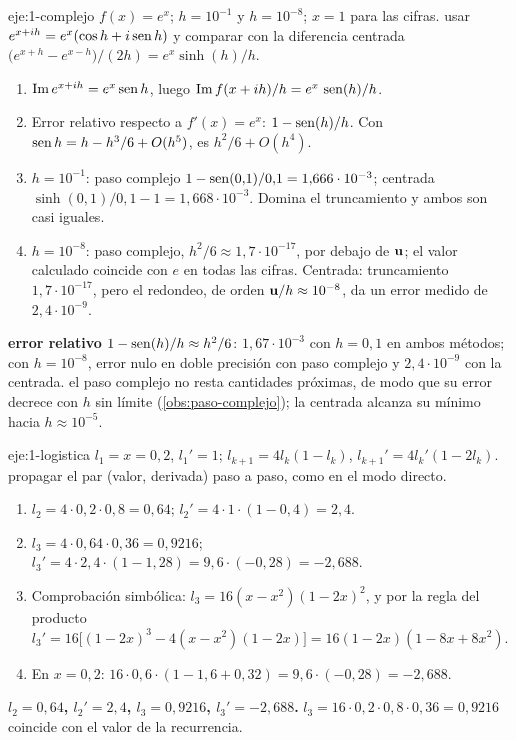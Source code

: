 \begin{solucion}{eje:1-complejo}
\datos $f(x)=e^{x}$; $h=10^{-1}$ y $h=10^{-8}$; $x=1$ para las cifras.
\planteamiento usar $e^{x+ih}=e^{x}(\cos h+i\operatorname{sen} h)$ y comparar con la diferencia centrada $\bigl(e^{x+h}-e^{x-h}\bigr)/(2h)=e^{x}\sinh(h)/h$.
\pasos
\begin{enumerate}[label=\arabic*.]
  \item $\operatorname{Im}e^{x+ih}=e^{x}\operatorname{sen} h$, luego $\operatorname{Im}f(x+ih)/h=e^{x}\,\operatorname{sen}(h)/h$.
  \item Error relativo respecto a $f'(x)=e^{x}$: $1-\operatorname{sen}(h)/h$. Con $\operatorname{sen} h=h-h^{3}/6+O(h^{5})$, es $h^{2}/6+O(h^{4})$.
  \item $h=10^{-1}$: paso complejo $1-\operatorname{sen}(0{,}1)/0{,}1=1{,}666\cdot 10^{-3}$; centrada $\sinh(0{,}1)/0{,}1-1=1{,}668\cdot 10^{-3}$. Domina el truncamiento y ambos son casi iguales.
  \item $h=10^{-8}$: paso complejo, $h^{2}/6\approx 1{,}7\cdot 10^{-17}$, por debajo de $\mathbf{u}$; el valor calculado coincide con $e$ en todas las cifras. Centrada: truncamiento $1{,}7\cdot 10^{-17}$, pero el redondeo, de orden $\mathbf{u}/h\approx 10^{-8}$, da un error medido de $2{,}4\cdot 10^{-9}$.
\end{enumerate}
\resultado \textbf{error relativo $1-\operatorname{sen}(h)/h\approx h^{2}/6$}: $1{,}67\cdot 10^{-3}$ con $h=0{,}1$ en ambos métodos; con $h=10^{-8}$, error nulo en doble precisión con paso complejo y $2{,}4\cdot 10^{-9}$ con la centrada.
\comprobacion el paso complejo no resta cantidades próximas, de modo que su error decrece con $h$ sin límite (\cref{obs:paso-complejo}); la centrada alcanza su mínimo hacia $h\approx 10^{-5}$.
\end{solucion}

\begin{solucion}{eje:1-logistica}
\datos $l_1=x=0{,}2$, $l_1'=1$; $l_{k+1}=4l_k(1-l_k)$, $l_{k+1}'=4l_k'(1-2l_k)$.
\planteamiento propagar el par (valor, derivada) paso a paso, como en el modo directo.
\pasos
\begin{enumerate}[label=\arabic*.]
  \item $l_2=4\cdot 0{,}2\cdot 0{,}8=0{,}64$; $l_2'=4\cdot 1\cdot(1-0{,}4)=2{,}4$.
  \item $l_3=4\cdot 0{,}64\cdot 0{,}36=0{,}9216$; $l_3'=4\cdot 2{,}4\cdot(1-1{,}28)=9{,}6\cdot(-0{,}28)=-2{,}688$.
  \item Comprobación simbólica: $l_3=16(x-x^{2})(1-2x)^{2}$, y por la regla del producto
  $l_3'=16\bigl[(1-2x)^{3}-4(x-x^{2})(1-2x)\bigr]=16(1-2x)(1-8x+8x^{2})$.
  \item En $x=0{,}2$: $16\cdot 0{,}6\cdot(1-1{,}6+0{,}32)=9{,}6\cdot(-0{,}28)=-2{,}688$.
\end{enumerate}
\resultado \textbf{$l_2=0{,}64$, $l_2'=2{,}4$, $l_3=0{,}9216$, $l_3'=-2{,}688$.}
\comprobacion $l_3=16\cdot 0{,}2\cdot 0{,}8\cdot 0{,}36=0{,}9216$ coincide con el valor de la recurrencia.
\end{solucion}

